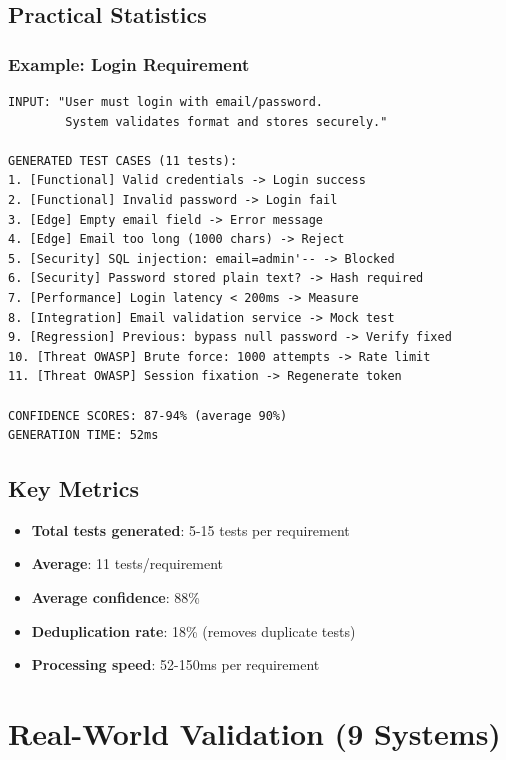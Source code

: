 \documentclass[12pt,a4paper]{report}
\begin{document}
\section{Practical Statistics}

\subsection{Example: Login Requirement}
\begin{verbatim}
INPUT: "User must login with email/password. 
        System validates format and stores securely."

GENERATED TEST CASES (11 tests):
1. [Functional] Valid credentials -> Login success
2. [Functional] Invalid password -> Login fail
3. [Edge] Empty email field -> Error message
4. [Edge] Email too long (1000 chars) -> Reject
5. [Security] SQL injection: email=admin'-- -> Blocked
6. [Security] Password stored plain text? -> Hash required
7. [Performance] Login latency < 200ms -> Measure
8. [Integration] Email validation service -> Mock test
9. [Regression] Previous: bypass null password -> Verify fixed
10. [Threat OWASP] Brute force: 1000 attempts -> Rate limit
11. [Threat OWASP] Session fixation -> Regenerate token

CONFIDENCE SCORES: 87-94% (average 90%)
GENERATION TIME: 52ms
\end{verbatim}

\section{Key Metrics}

\begin{itemize}
    \item \textbf{Total tests generated}: 5-15 tests per requirement
    \item \textbf{Average}: 11 tests/requirement
    \item \textbf{Average confidence}: 88\%
    \item \textbf{Deduplication rate}: 18\% (removes duplicate tests)
    \item \textbf{Processing speed}: 52-150ms per requirement
\end{itemize}

\chapter{Real-World Validation (9 Systems)}
\end{document}
